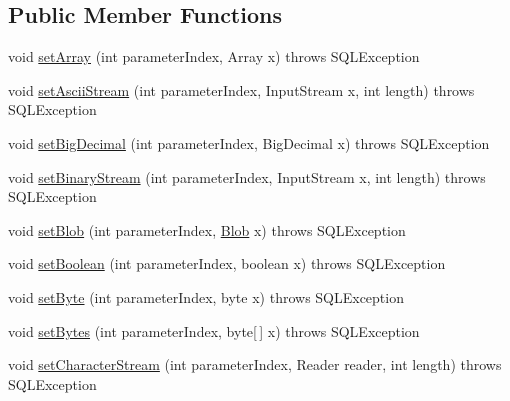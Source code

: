 \subsection*{Public Member Functions}
\begin{DoxyCompactItemize}
\item 
void \mbox{\hyperlink{classcom_1_1mysql_1_1cj_1_1jdbc_1_1_prepared_statement_wrapper_a8cc6318267fc3fe6820a11923c04538c}{set\+Array}} (int parameter\+Index, Array x)  throws S\+Q\+L\+Exception 
\item 
void \mbox{\hyperlink{classcom_1_1mysql_1_1cj_1_1jdbc_1_1_prepared_statement_wrapper_af7d43540b76d8ea4a86b8841a4e455e5}{set\+Ascii\+Stream}} (int parameter\+Index, Input\+Stream x, int length)  throws S\+Q\+L\+Exception 
\item 
void \mbox{\hyperlink{classcom_1_1mysql_1_1cj_1_1jdbc_1_1_prepared_statement_wrapper_a1c7a22c3777ac3e8655f0fd2fede4d7e}{set\+Big\+Decimal}} (int parameter\+Index, Big\+Decimal x)  throws S\+Q\+L\+Exception 
\item 
void \mbox{\hyperlink{classcom_1_1mysql_1_1cj_1_1jdbc_1_1_prepared_statement_wrapper_a57f7cc239a858005d4148144f1047cc5}{set\+Binary\+Stream}} (int parameter\+Index, Input\+Stream x, int length)  throws S\+Q\+L\+Exception 
\item 
void \mbox{\hyperlink{classcom_1_1mysql_1_1cj_1_1jdbc_1_1_prepared_statement_wrapper_a1ab193ae02d485756815d66713e8eb57}{set\+Blob}} (int parameter\+Index, \mbox{\hyperlink{classcom_1_1mysql_1_1cj_1_1jdbc_1_1_blob}{Blob}} x)  throws S\+Q\+L\+Exception 
\item 
void \mbox{\hyperlink{classcom_1_1mysql_1_1cj_1_1jdbc_1_1_prepared_statement_wrapper_a7bb05bc6788f98b9eda28cc46110fcb3}{set\+Boolean}} (int parameter\+Index, boolean x)  throws S\+Q\+L\+Exception 
\item 
void \mbox{\hyperlink{classcom_1_1mysql_1_1cj_1_1jdbc_1_1_prepared_statement_wrapper_ad9b065cc8c5a1e6ab3f5957c387c982c}{set\+Byte}} (int parameter\+Index, byte x)  throws S\+Q\+L\+Exception 
\item 
void \mbox{\hyperlink{classcom_1_1mysql_1_1cj_1_1jdbc_1_1_prepared_statement_wrapper_a5b5770d081da9baf8ca33f3567f69905}{set\+Bytes}} (int parameter\+Index, byte\mbox{[}$\,$\mbox{]} x)  throws S\+Q\+L\+Exception 
\item 
void \mbox{\hyperlink{classcom_1_1mysql_1_1cj_1_1jdbc_1_1_prepared_statement_wrapper_acee49f9b94421c746c1f42a6ec889c99}{set\+Character\+Stream}} (int parameter\+Index, Reader reader, int length)  throws S\+Q\+L\+Exception 

\end{DoxyCompactItemize}
